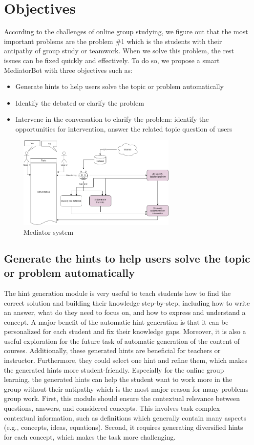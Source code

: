 \documentclass[letterpaper%
, twoside%
, 12pt%
,these%
, english%
,creativecommons,hyperref, withAlgo2e %
]{thETS}
\begin{document}
\section{Objectives}
According to the challenges of online group studying, we figure out that the most important problems are the problem \#1 which is the students with their antipathy of group study or teamwork. When we solve this problem, the rest issues can be fixed quickly and effectively. To do so, we propose a smart MediatorBot with three objectives such as: 
\begin{itemize}
	\item Generate hints to help users solve the topic or problem automatically
	\item    Identify the debated or clarify the problem
	\item Intervene in the conversation to clarify the problem: identify the opportunities for intervention, answer the related topic question of users
\end{itemize}
\begin{figure}
	\includegraphics[width=0.7\textwidth]{Figures/2.png}
	\caption{Mediator system}
	\label{MS}
\end{figure}


\subsection{Generate the hints to help users solve the topic or problem automatically}
The hint generation module is very useful to teach students how to find the correct solution and building their knowledge step-by-step, including how to write an answer, what do they need to focus on, and how to express and understand a concept. A major benefit of the automatic hint generation is that it can be personalized for each student and fix their knowledge gaps. Moreover, it is also a useful exploration for the future task of automatic generation of the content of courses. Additionally, these generated hints are beneficial for teachers or instructor. Furthermore, they could select one hint and refine them, which makes the generated hints more student-friendly. Especially for the online group learning, the generated hints can help the student want to work more in the group without their antipathy which is the most major reason for many problems group work. First, this module should ensure the contextual relevance between questions, answers, and considered concepts. This involves task complex contextual information, such as definitions which generally contain many aspects (e.g., concepts, ideas, equations). Second, it requires generating diversified hints for each concept, which makes the task more challenging.
\end{document}
